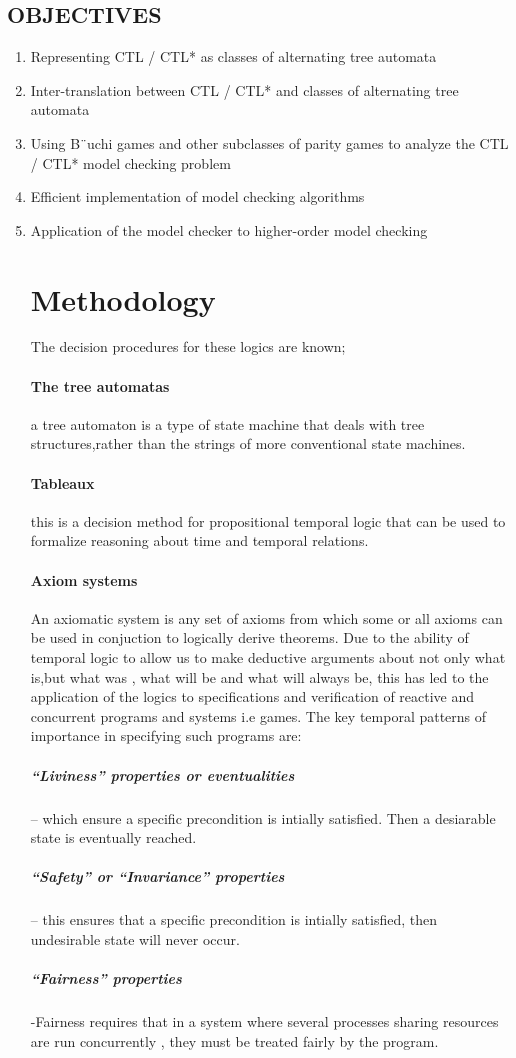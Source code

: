 \documentclass[12pt,letterpaper]{article}
\begin{document}
\subsection{OBJECTIVES}
  \begin{enumerate}
    \item Representing CTL / CTL* as classes of alternating tree automata\\
    \item Inter-translation between CTL / CTL* and classes of alternating tree automata\\
    \item Using B¨uchi games and other subclasses of parity games to analyze the CTL / CTL* model checking problem\\
    \item Efficient implementation of model checking algorithms\\
    \item Application of the model checker to higher-order model checking\\
   
\section{ Methodology}

The decision procedures for these logics are known;
\paragraph{ The tree automatas}
	a tree automaton is a type of state machine that deals with tree structures,rather than the strings of more conventional state machines.
\paragraph{ Tableaux}
	this is a decision method for propositional temporal logic that can be used to formalize reasoning about time and temporal relations.
\paragraph{Axiom systems}
	An axiomatic system is any set of axioms from which some or all axioms can be used in conjuction to logically derive theorems.
Due to the ability of temporal logic to allow us to make deductive arguments about not only what is,but what was , what will be and what will always be, this has led to the application of the logics to specifications and verification of reactive and concurrent programs and systems i.e games.
The key temporal patterns of importance in specifying such programs are:
\subparagraph{“Liviness” properties or eventualities }– which ensure a specific precondition is intially satisfied. Then a desiarable state is eventually reached.
\subparagraph{“Safety” or “Invariance” properties} – this ensures that a specific precondition is intially satisfied, then undesirable state will never occur.
\subparagraph{“Fairness” properties} -Fairness requires that in a system where several processes sharing resources are run concurrently , they must be treated fairly by the program.

\end{enumerate}
\end{document}
